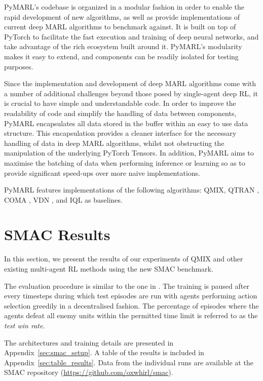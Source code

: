 \documentclass[twoside,11pt]{article}
\renewcommand{\cite}{\citep}
\begin{document}
PyMARL's codebase is organized in a modular fashion in order to enable the rapid development of new algorithms, as well as provide implementations of current deep MARL algorithms to benchmark against. It is built on top of PyTorch to facilitate the fast execution and training of deep neural networks, and take advantage of the rich ecosystem built around it. PyMARL's modularity makes it easy to extend, and components can be readily isolated for testing purposes.

Since the implementation and development of deep MARL algorithms come with a number of additional challenges beyond those posed by single-agent deep RL, it is crucial to have simple and understandable code. In order to improve the readability of code and simplify the handling of data between components, PyMARL encapsulates all data stored in the buffer within an easy to use data structure. This encapsulation provides a cleaner interface for the necessary handling of data in deep MARL algorithms, whilst not obstructing the manipulation of the underlying PyTorch Tensors. In addition, PyMARL aims to maximise the batching of data when performing inference or learning so as to provide significant speed-ups over more naive implementations. 

PyMARL features implementations of the following algorithms: QMIX, QTRAN \cite{son_qtran:_2019}, COMA \cite{foerster_counterfactual_2017}, VDN \cite{sunehag_value-decomposition_2017}, and IQL \cite{tan_multi-agent_1993} as baselines.




 \section{SMAC Results}
\label{sec:results}



In this section, we present the results of our experiments of QMIX and other existing multi-agent RL methods using the new SMAC benchmark.

The evaluation procedure is similar to the one in \cite{rashid2018qmix}. The training is paused after every  timesteps during which  test episodes are run with agents performing action selection greedily in a decentralised fashion. The percentage of episodes where the agents defeat all enemy units within the permitted time limit is referred to as the \textit{test win rate}.

The architectures and training details are presented in Appendix~\ref{sec:smac_setup}.
A table of the results is included in Appendix~\ref{sec:table_results}.
Data from the individual runs are available at the SMAC repository (\url{https://github.com/oxwhirl/smac}).
\end{document}

